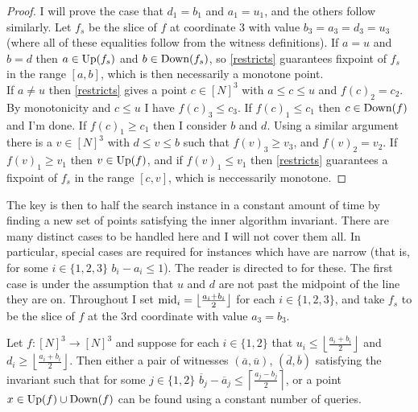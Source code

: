 \begin{proof}
  I will prove the case that $d_1 = b_1$ and $a_1 = u_1$, and the others follow similarly.
  Let $f_s$ be the slice of $f$ at coordinate $3$ with value $b_3 = a_3 = d_3 = u_3$ (where all of
  these equalities follow from the witness definitions). If $a = u$ and $b = d$ then $a \in \mathrm{Up}(f_s)$ and
  $b \in \text{Down}(f_s)$, so \cref{restricts} guarantees fixpoint of $f_s$ in the range $[a, b]$, which is then
  necessarily a monotone point. \\
  If $a \neq u$ then \cref{restricts} gives a point $c \in [N]^3$ with $a \leq c \leq u$ and $f(c)_2 = c_2$.
  By monotonicity and $c \leq u$ I have $f(c)_3 \leq c_3$. If $f(c)_1 \leq c_1$ then $c \in \text{Down}(f)$ and I'm done.
  If $f(c)_1 \geq c_1$ then I consider $b$ and $d$. Using a similar argument there is a $v \in [N]^3$ with $d \leq v \leq b$
  such that $f(v)_3 \geq v_3$, and $f(v)_2 = v_2$. If $f(v)_1 \geq v_1$ then $v \in \mathrm{Up}(f)$, and if $f(v)_1 \leq v_1$
  then \cref{restricts} guarantees a fixpoint of $f_s$ in the range $[c, v]$, which is neccessarily monotone.
\end{proof}
The key is then to half the search instance in a constant amount of time by finding
a new set of points satisfying the inner algorithm invariant. There are many distinct cases
to be handled here and I will not cover them all. In particular, special cases are required for
instances which have are narrow (that is, for some $i \in \{1, 2, 3\}$ $b_i - a_i \leq 1$). The 
reader is directed to \citep{fasterTarski} for these. The first case is under the assumption that $u$ and $d$ are
not past the midpoint of the line they are on.
Throughout I set $\text{mid}_i = \left \lfloor \frac{a_i + b_i}{2} \right\rfloor$ for each $i \in \{1, 2, 3\}$, and take
$f_s$ to be the slice of $f$ at the $3$rd coordinate with value $a_3 = b_3$.
\begin{lemma}\label{innerMainCase}
  Let $f : [N]^3 \to [N]^3$ and
  suppose for each $i \in \{1, 2\}$ that $u_i \leq \left \lfloor \frac{a_i + b_i}{2} \right \rfloor$
  and $d_i \geq \left \lfloor \frac{a_i + b_i}{2} \right\rfloor$.
  Then either a pair of witnesses $(\overline{a}, \overline{u})$, $(\overline{d}, \overline{b})$ satisfying the invariant
  such that for some $j \in \{1, 2\}$ $\overline{b}_j - \overline{a}_j \leq \left\lceil \frac{a_j - b_j}{2}\right \rceil$, 
  or a point $x \in \mathrm{Up}(f) \cup \text{Down}(f)$
  can be found using a constant
  number of queries. 
\end{lemma}
